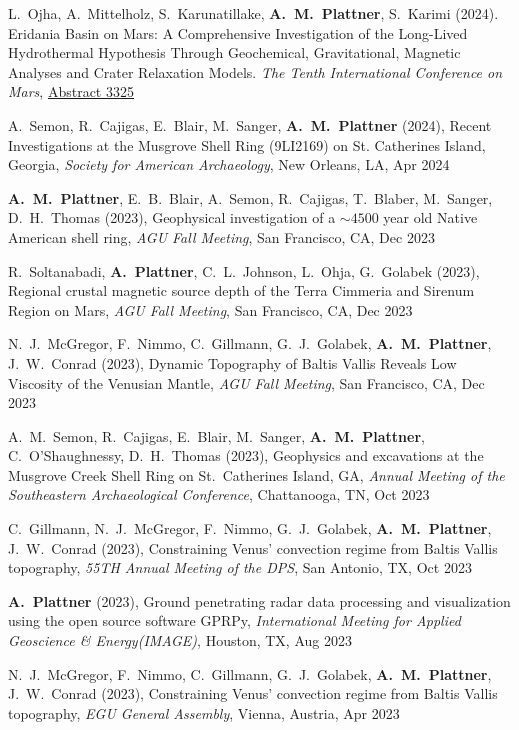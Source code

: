 \documentclass[10pt]{article}
\begin{document}
\spcp
L.\ Ojha, A.\ Mittelholz, S.\ Karunatillake, \textbf{A.\ M.\ Plattner}, S.\ Karimi (2024). Eridania Basin on Mars: A Comprehensive Investigation of the Long-Lived Hydrothermal Hypothesis Through Geochemical, Gravitational, Magnetic Analyses and Crater Relaxation Models. \emph{The Tenth International Conference on Mars}, \href{https://www.hou.usra.edu/meetings/tenthmars2024/pdf/3325.pdf}{Abstract 3325}

\spcp A.\ Semon, R.\ Cajigas, E.\ Blair, M.\ Sanger, \textbf{A.\ M.\ Plattner} (2024), Recent Investigations at the Musgrove Shell Ring (9LI2169) on St. Catherines Island, Georgia, \emph{Society for American Archaeology}, New Orleans, LA, Apr 2024

\spcp
\textbf{A.~M.~Plattner}, E.~B.~Blair, A.~Semon, R.~Cajigas, T.~Blaber, M.~Sanger, D.~H.~Thomas (2023), Geophysical investigation of a $\sim4500$ year old Native American shell ring, \emph{AGU Fall Meeting}, San Francisco, CA, Dec 2023

\spcp
R.~Soltanabadi, \textbf{A.~Plattner}, C.~L.~Johnson, L.~Ohja, G.~Golabek (2023), Regional crustal magnetic source depth of the Terra Cimmeria and Sirenum Region on Mars, \emph{AGU Fall Meeting}, San Francisco, CA, Dec 2023 

\spcp
N.~J.~McGregor, F.~Nimmo, C.~Gillmann, G.~J.~Golabek, \textbf{A.~M.~Plattner}, J.~W.~Conrad (2023), Dynamic Topography of Baltis Vallis Reveals Low Viscosity of the Venusian Mantle, \emph{AGU Fall Meeting}, San Francisco, CA, Dec 2023

\spcp
A.~M.~Semon, R.~Cajigas, E.~Blair, M.~Sanger, \textbf{A.~M.~Plattner}, C.~O'Shaughnessy, D.~H.~Thomas (2023), Geophysics and excavations at the Musgrove Creek Shell Ring on St.\ Catherines Island, GA, \emph{Annual Meeting of the Southeastern Archaeological Conference}, Chattanooga, TN, Oct 2023

\spcp
C.~Gillmann, N.~J.~McGregor, F.~Nimmo, G.~J.~Golabek, \textbf{A.~M.~Plattner}, J.~W.~Conrad (2023), Constraining Venus' convection regime from Baltis Vallis topography, \emph{55TH Annual Meeting of the DPS}, San Antonio, TX, Oct 2023


\spcp \textbf{A.~Plattner} (2023), Ground penetrating radar data processing and visualization using the open source software GPRPy, \emph{International Meeting for Applied Geoscience \& Energy(IMAGE)}, Houston, TX, Aug 2023

\spcp
N.~J.~McGregor, F.~Nimmo, C.~Gillmann, G.~J.~Golabek, \textbf{A.~M.~Plattner}, J.~W.~Conrad (2023), Constraining Venus' convection regime from Baltis Vallis topography, \emph{EGU General Assembly}, Vienna, Austria, Apr 2023
\end{document}
